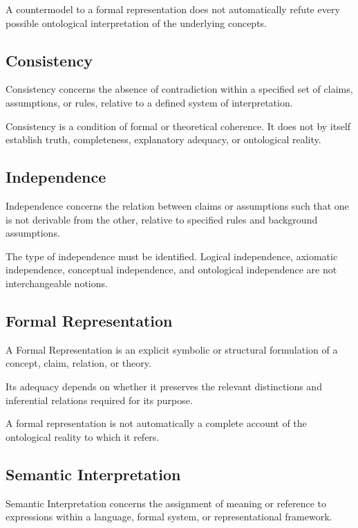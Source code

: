 A countermodel to a formal representation does not automatically
refute every possible ontological interpretation of the underlying
concepts.


\subsection*{Consistency}

Consistency concerns the absence of contradiction within a specified
set of claims, assumptions, or rules, relative to a defined system
of interpretation.

Consistency is a condition of formal or theoretical coherence.
It does not by itself establish truth, completeness, explanatory
adequacy, or ontological reality.


\subsection*{Independence}

Independence concerns the relation between claims or assumptions
such that one is not derivable from the other, relative to specified
rules and background assumptions.

The type of independence must be identified. Logical independence,
axiomatic independence, conceptual independence, and ontological
independence are not interchangeable notions.


\subsection*{Formal Representation}

A Formal Representation is an explicit symbolic or structural
formulation of a concept, claim, relation, or theory.

Its adequacy depends on whether it preserves the relevant distinctions
and inferential relations required for its purpose.

A formal representation is not automatically a complete account
of the ontological reality to which it refers.


\subsection*{Semantic Interpretation}

Semantic Interpretation concerns the assignment of meaning or
reference to expressions within a language, formal system, or
representational framework.

